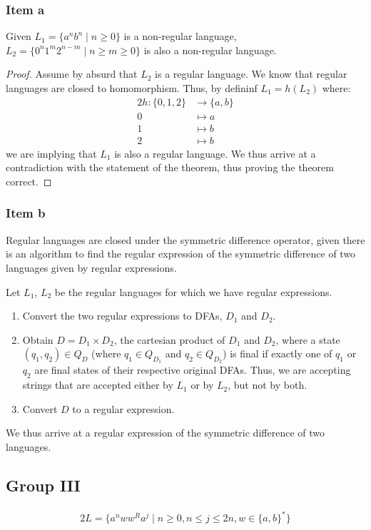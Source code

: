 \documentclass[docid=2018/19]{tcom_exam}
\begin{document}
{\subsubsection{Item a}
\begin{theorem}
	Given $L_1=\{a^n b^n \mid n \geq 0\}$ is a non-regular language, $L_2=\{0^n 1^m 2^{n-m} \mid  n \geq m \geq 0\}$ is also a non-regular language.
\end{theorem}
\begin{proof}
	Assume by absurd that $L_2$ is a regular language. We know that regular languages are closed to homomorphism. Thus, by defininf $L_1=h(L_2)$ where:
	\begin{alignat*}{2}
		h \colon \{0,1,2\} &\rightarrow \{a,b\}\\
		0                  &\mapsto a\\
		1                  &\mapsto b\\
		2                  &\mapsto b
	\end{alignat*}
	we are implying that $L_1$ is also a regular language. We thus arrive at a contradiction with the statement of the theorem, thus proving the theorem correct.
\end{proof}
\subsubsection{Item b}
Regular languages are closed under the symmetric difference operator, given there is an algorithm to find the regular expression of the symmetric difference of two languages given by regular expressions.\par
Let $L_1$, $L_2$ be the regular languages for which we have regular expressions.
\begin{enumerate}
	\item Convert the two regular expressions to DFAs, $D_1$ and $D_2$.
	\item Obtain $D=D_1 \times D_2$, the cartesian product of $D_1$ and $D_2$, where a state $(q_1,q_2)\in Q_D$ (where $q_1 \in Q_{D_1}$ and $q_2 \in Q_{D_2}$) is final if exactly one of $q_1$ or $q_2$ are final states of their respective original DFAs. Thus, we are accepting strings that are accepted either by $L_1$ or by $L_2$, but not by both.
	\item Convert $D$ to a regular expression.
\end{enumerate}
We thus arrive at a regular expression of the symmetric difference of two languages.
\pagebreak
\subsection{Group III}
\begin{alignat*}{2}
	L=\{a^n w w^R a^j \mid n \geq 0, n \leq j \leq 2n, w \in \{a,b\}^*\}
\end{alignat*}
}
\end{document}
